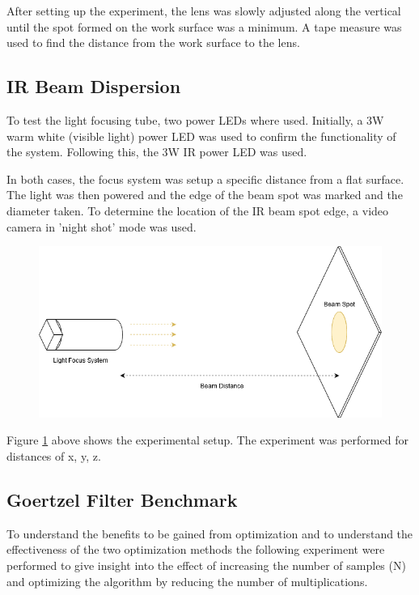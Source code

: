 After setting up the experiment, the lens was slowly adjusted along the vertical until the spot formed on the work surface was a minimum. A tape measure was used to find the distance from the work surface to the lens.

\subsection{IR Beam Dispersion}

To test the light focusing tube, two power LEDs where used. Initially, a 3W warm white (visible light) power LED was used to confirm the functionality of the system. Following this, the 3W IR power LED was used.

In both cases, the focus system was setup a specific distance from a flat surface. The light was then powered and the edge of the beam spot was marked and the diameter taken. To determine the location of the IR beam spot edge, a video camera in 'night shot' mode was used.

\begin{figure}[H]
	\centering
	\includegraphics[width=.7\linewidth]{figures/experimentation/beam_spot_experiement.png}
	\label{fig:focus_system_experiemnt}
\end{figure}

Figure \ref{fig:focus_system_experiemnt} above shows the experimental setup. The experiment was performed for distances of x, y, z.

\subsection{Goertzel Filter Benchmark}

To understand the benefits to be gained from optimization and to understand the effectiveness of the two optimization methods the following experiment were performed to give insight into the effect of increasing the number of samples (N) and optimizing the algorithm by reducing the number of multiplications.

